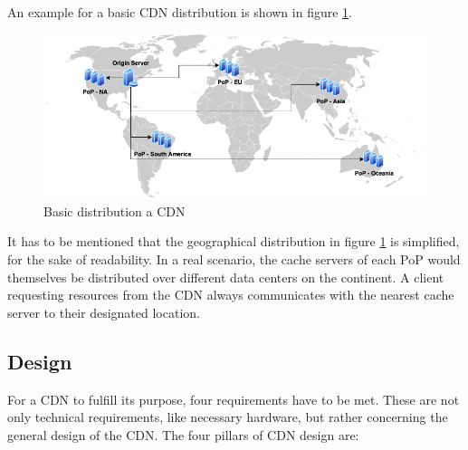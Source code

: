 An example for a basic CDN distribution is shown in figure \ref{fig:cdn_general_arch}.

\begin{figure}[!h]
	\centering
	\includegraphics[width=1\textwidth]{Figures/basic_cdn_arch.drawio.png}
	\caption{Basic distribution a CDN}
	\label{fig:cdn_general_arch}
\end{figure}

It has to be mentioned that the geographical distribution in figure \ref{fig:cdn_general_arch} is simplified, for the sake of readability. In a real scenario, the cache servers of each PoP would themselves be distributed over different data centers on the continent. A client requesting resources from the CDN always communicates with the nearest cache server to their designated location.\cite{cdn_general}

\subsection{Design}

For a CDN to fulfill its purpose, four requirements have to be met. These are not only technical requirements, like necessary hardware, but rather concerning the general design of the CDN.
The four pillars of CDN design are:

